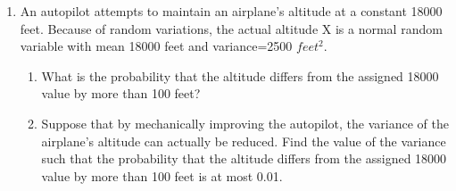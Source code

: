 \begin{enumerate}
 \item An autopilot attempts to maintain an airplane's altitude at a constant
    18000 feet. Because of random variations, the actual altitude X is a normal
    random variable with mean 18000 feet and variance=2500 $feet^2$.
    \begin{enumerate}
      \item What is the probability that the altitude differs from the assigned 18000 value by
        more than 100 feet?
      \item Suppose that by mechanically improving the autopilot,
        the variance of the airplane's altitude can actually be
        reduced. Find the value of the variance such that the probability that the altitude differs from the assigned 18000
        value by more than 100 feet is at most 0.01.
    \end{enumerate}


\end{enumerate}
